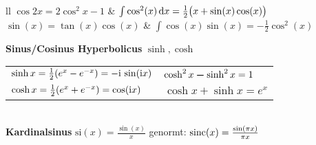 \documentclass[german,color,6pt]{latex4ei/latex4ei_fs}
\begin{document}
\begin{sectionbox}
\begin{tablebox}{ll}
	 	$\cos 2x = 2\cos^2 x - 1$  & $\int \cos^2(x) \diff x = \frac12 \bigl(x + \sin(x)\cos(x) \bigr)$\\
	 	$\sin(x) = \tan(x)\cos(x)$ & $\int \cos(x)\sin(x) = -\frac12 \cos^2(x)$ \\
	\end{tablebox}
		\textbf{Sinus/Cosinus Hyperbolicus} $\sinh, \cosh$\\ 
		\begin{tabular*}{\columnwidth}{@{\extracolsep\fill}ll@{}}
		$\sinh x = \frac{1}{2}(e^x -e^{-x})= - \mathrm{i} \, \sin(\mathrm{i} x)$ & $\cosh^2 x  \boldsymbol{-} \sinh^2 x = 1$\\
		$\cosh x  = \frac{1}{2}(e^x +e^{-x})= \cos(\mathrm{i} x)$ & $\cosh x + \sinh x = e^{x}$\\
		\end{tabular*}\\
		\textbf{Kardinalsinus} $\mathrm{si}(x) = \frac{\sin(x)}{x}$ \qquad genormt: $\operatorname{sinc}(x) = \frac{\sin(\pi x)}{\pi x}$
\end{sectionbox}
\end{document}
